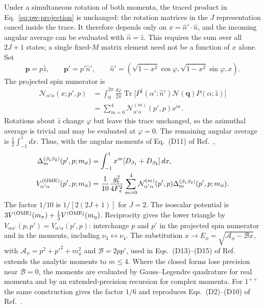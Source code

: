 Under a simultaneous rotation of both momenta, the traced product in
Eq.~\eqref{eq:pw-projection} is unchanged: the rotation matrices in the
$J$ representation cancel inside the trace. It therefore depends only on
$x=\hat n'\cdot\hat n$, and the incoming angular average can be evaluated
with $\hat n=\hat z$. This requires the sum over all $2J+1$ states; a single
fixed-$M$ matrix element need not be a function of $x$ alone.
Set
\begin{equation}
 \bm p=p\hat z,\qquad \bm p'=p'\hat n',\qquad
 \hat n'=(\sqrt{1-x^2}\cos\varphi,\sqrt{1-x^2}\sin\varphi,x).
\end{equation}
The projected spin numerator is
\begin{equation}
\begin{split}
 \mathcal N_{\alpha'\alpha}(x;p',p)
 &=\int_0^{2\pi}\frac{d\varphi}{2\pi}
 \operatorname{Tr}\bigl[P^\dagger(\alpha';\hat n')
 \mathcal N(\bm q)P(\alpha;\hat z)\bigr]\\
 &=\sum_{m=0}^{4}\mathcal N^{(m)}_{\alpha'\alpha}(p',p)x^m.
\end{split}
\label{eq:projected-spin-numerator}
\end{equation}
Rotations about $\hat z$ change $\varphi$ but leave this trace unchanged,
so the azimuthal average is trivial and may be evaluated at $\varphi=0$.
The remaining angular average is $\tfrac12\int_{-1}^1dx$. Thus, with the
angular moments of Eq.~(D11) of Ref.~\cite{Zhang:2026iyr},
\begin{align}
 \Delta_m^{(\beta_1\beta_2)}(p',p;m_\phi)
 &=\int_{-1}^{1}x^m[D_{\beta_1}+D_{\beta_2}]\,dx,
 \label{eq:ome-angular-moments}\\
 V^{\rm(OME)}_{\alpha'\alpha}(p',p;m_\phi)
 &=\frac1{10}\frac{g_b^2}{4F_\pi^2}\sum_{m=0}^4
 \mathcal N^{(m)}_{\alpha'\alpha}(p',p)
 \Delta_m^{(\beta_1\beta_2)}(p',p;m_\phi).
 \label{eq:ome-2pp-entry}
\end{align}
The factor $1/10$ is $1/[2(2J+1)]$ for $J=2$. The isoscalar potential is
$3V^{\rm(OME)}(m_\pi)+\tfrac13V^{\rm(OME)}(m_\eta)$.
Reciprocity gives the lower triangle by
$V_{\alpha\alpha'}(p,p')=V_{\alpha'\alpha}(p',p)$: interchange $p$ and $p'$
in the projected spin numerator and in the moments, including
$\nu_3\leftrightarrow\nu_4$.
The substitution $x\to E_\phi=\sqrt{\mathcal A_\phi-\mathcal Bx}$, with
$\mathcal A_\phi=p^2+p'^2+m_\phi^2$ and $\mathcal B=2pp'$, used in
Eqs.~(D13)--(D15) of Ref.~\cite{Zhang:2026iyr} extends the analytic moments
to $m\leq4$. Where the closed forms lose precision near $\mathcal B=0$,
the moments are evaluated by Gauss--Legendre quadrature for real momenta
and by an extended-precision recursion for complex momenta.
For $1^{++}$ the same construction gives the factor $1/6$ and reproduces
Eqs.~(D2)--(D10) of Ref.~\cite{Zhang:2026iyr}.

